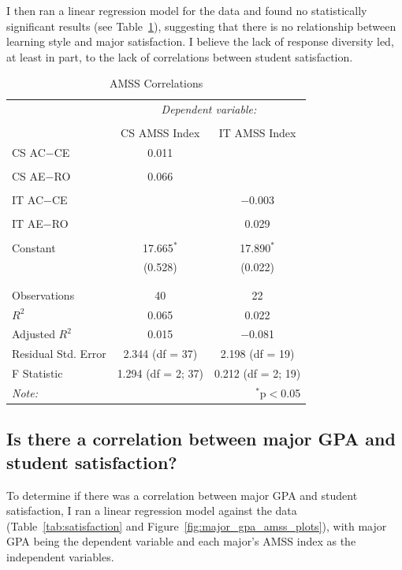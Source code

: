 I then ran a linear regression model for the data and found no statistically significant results (see Table~\ref{tab:amss_corr}), suggesting that there is no relationship between learning style and major satisfaction. I believe the lack of response diversity led, at least in part, to the lack of correlations between student satisfaction.

\begin{table}[!htbp] \centering
  \caption{AMSS Correlations}
  \label{tab:amss_corr}
  \begin{tabular}{@{\extracolsep{5pt}}lcc}
    \toprule
    & \multicolumn{2}{c}{\textit{Dependent variable:}} \\
    \cline{2-3}
    \\[-1.8ex] & CS AMSS Index & IT AMSS Index \\
    \midrule
    CS AC$-$CE & 0.011 &  \\
    & & \\
    CS AE$-$RO & 0.066 &  \\
    & & \\
    IT AC$-$CE &  & $-$0.003 \\
    & & \\
    IT AE$-$RO &  & 0.029 \\
    & & \\
    Constant & 17.665$^{*}$ & 17.890$^{*}$ \\
    & (0.528) & (0.022) \\
    & & \\
    \hline \\[-1.8ex]
    Observations & 40 & 22 \\
    $R^{2}$ & 0.065 & 0.022 \\
    Adjusted $R^{2}$ & 0.015 & $-$0.081 \\
    Residual Std. Error & 2.344 (df = 37) & 2.198 (df = 19) \\
    F Statistic & 1.294 (df = 2; 37) & 0.212 (df = 2; 19) \\
    \bottomrule
    \textit{Note:}  & \multicolumn{2}{r}{$^{*}$p$<$0.05} \\
  \end{tabular}
\end{table}

\subsection{Is there a correlation between major GPA and student satisfaction?}
To determine if there was a correlation between major GPA and student satisfaction, I ran a linear regression model against the data (Table~\ref{tab:satisfaction} and Figure~\ref{fig:major_gpa_amss_plots}), with major GPA being the dependent variable and each major's AMSS index as the independent variables.

